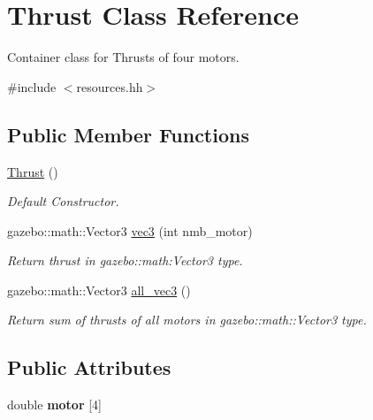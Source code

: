 \hypertarget{classThrust}{\section{\-Thrust \-Class \-Reference}
\label{classThrust}
}


\-Container class for \-Thrusts of four motors.  




{\ttfamily \#include $<$resources.\-hh$>$}

\subsection*{\-Public \-Member \-Functions}
\begin{DoxyCompactItemize}
\item 
\hypertarget{classThrust_ac5c6aefb280d3d3ffe2970c1a6d7f421}{\hyperlink{classThrust_ac5c6aefb280d3d3ffe2970c1a6d7f421}{\-Thrust} ()}\label{classThrust_ac5c6aefb280d3d3ffe2970c1a6d7f421}

\begin{DoxyCompactList}\small\item\em \-Default \-Constructor. \end{DoxyCompactList}\item 
gazebo\-::math\-::\-Vector3 \hyperlink{classThrust_a9eb98d876a28c1f9d84bf329df9f3bab}{vec3} (int nmb\-\_\-motor)
\begin{DoxyCompactList}\small\item\em \-Return thrust in gazebo\-::math\-:\-Vector3 type. \end{DoxyCompactList}\item 
\hypertarget{classThrust_aacfa892b397ca841afd069d44d798159}{gazebo\-::math\-::\-Vector3 \hyperlink{classThrust_aacfa892b397ca841afd069d44d798159}{all\-\_\-vec3} ()}\label{classThrust_aacfa892b397ca841afd069d44d798159}

\begin{DoxyCompactList}\small\item\em \-Return sum of thrusts of all motors in gazebo\-::math\-::\-Vector3 type. \end{DoxyCompactList}\end{DoxyCompactItemize}
\subsection*{\-Public \-Attributes}
\begin{DoxyCompactItemize}
\item 
\hypertarget{classThrust_ae1670b0483f78052e37bfc43d7b5705b}{double {\bfseries motor} \mbox{[}4\mbox{]}}\label{classThrust_ae1670b0483f78052e37bfc43d7b5705b}

\end{DoxyCompactItemize}
